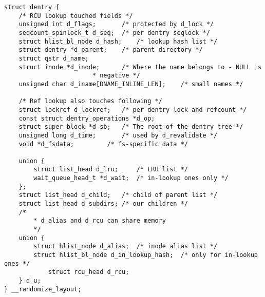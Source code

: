 
\begin{lstlisting}
struct dentry {
    /* RCU lookup touched fields */
    unsigned int d_flags;		/* protected by d_lock */
    seqcount_spinlock_t d_seq;	/* per dentry seqlock */
    struct hlist_bl_node d_hash;	/* lookup hash list */
    struct dentry *d_parent;	/* parent directory */
    struct qstr d_name;
    struct inode *d_inode;		/* Where the name belongs to - NULL is
                        * negative */
    unsigned char d_iname[DNAME_INLINE_LEN];	/* small names */

    /* Ref lookup also touches following */
    struct lockref d_lockref;	/* per-dentry lock and refcount */
    const struct dentry_operations *d_op;
    struct super_block *d_sb;	/* The root of the dentry tree */
    unsigned long d_time;		/* used by d_revalidate */
    void *d_fsdata;			/* fs-specific data */

    union {
        struct list_head d_lru;		/* LRU list */
        wait_queue_head_t *d_wait;	/* in-lookup ones only */
    };
    struct list_head d_child;	/* child of parent list */
    struct list_head d_subdirs;	/* our children */
    /*
        * d_alias and d_rcu can share memory
        */
    union {
        struct hlist_node d_alias;	/* inode alias list */
        struct hlist_bl_node d_in_lookup_hash;	/* only for in-lookup ones */
            struct rcu_head d_rcu;
    } d_u;
} __randomize_layout;
\end{lstlisting}
